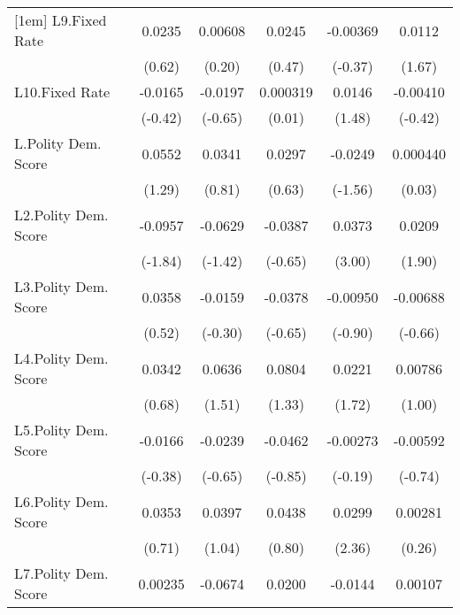 {\begin{longtable}{l*{5}{c}}
[1em]
L9.Fixed Rate   &   0.0235         &  0.00608         &   0.0245         & -0.00369         &   0.0112         \\
                &   (0.62)         &   (0.20)         &   (0.47)         &  (-0.37)         &   (1.67)         \\
[1em]
L10.Fixed Rate  &  -0.0165         &  -0.0197         & 0.000319         &   0.0146         & -0.00410         \\
                &  (-0.42)         &  (-0.65)         &   (0.01)         &   (1.48)         &  (-0.42)         \\
[1em]
L.Polity Dem. Score&   0.0552         &   0.0341         &   0.0297         &  -0.0249         & 0.000440         \\
                &   (1.29)         &   (0.81)         &   (0.63)         &  (-1.56)         &   (0.03)         \\
[1em]
L2.Polity Dem. Score&  -0.0957         &  -0.0629         &  -0.0387         &   0.0373\sym{**} &   0.0209         \\
                &  (-1.84)         &  (-1.42)         &  (-0.65)         &   (3.00)         &   (1.90)         \\
[1em]
L3.Polity Dem. Score&   0.0358         &  -0.0159         &  -0.0378         & -0.00950         & -0.00688         \\
                &   (0.52)         &  (-0.30)         &  (-0.65)         &  (-0.90)         &  (-0.66)         \\
[1em]
L4.Polity Dem. Score&   0.0342         &   0.0636         &   0.0804         &   0.0221         &  0.00786         \\
                &   (0.68)         &   (1.51)         &   (1.33)         &   (1.72)         &   (1.00)         \\
[1em]
L5.Polity Dem. Score&  -0.0166         &  -0.0239         &  -0.0462         & -0.00273         & -0.00592         \\
                &  (-0.38)         &  (-0.65)         &  (-0.85)         &  (-0.19)         &  (-0.74)         \\
[1em]
L6.Polity Dem. Score&   0.0353         &   0.0397         &   0.0438         &   0.0299\sym{*}  &  0.00281         \\
                &   (0.71)         &   (1.04)         &   (0.80)         &   (2.36)         &   (0.26)         \\
[1em]
L7.Polity Dem. Score&  0.00235         &  -0.0674         &   0.0200         &  -0.0144         &  0.00107         \\

\end{longtable}}
